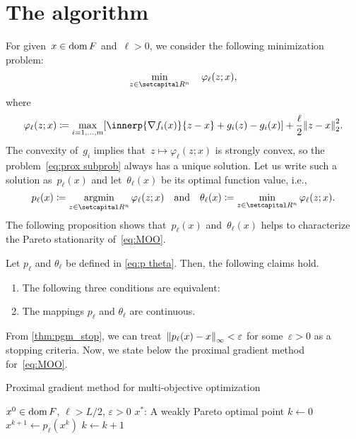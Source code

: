 \documentclass[../main]{subfiles}
\begin{document}
\section{The algorithm} \label{sec:pgm:algorithm}
For given~$x \in \dom F$ and~$\ell > 0$, we consider the following minimization problem:
\[ \label{eq:prox subprob}
    \min_{z \in \setR^n} \quad \varphi_\ell(z; x)
,\]
where
\[ \label{eq:varphi}
    \varphi_\ell(z; x) \coloneqq \max_{i = 1, \dots, m} [ \innerp{\nabla f_i(x)}{z - x} + g_i(z) - g_i(x) ] + \frac{\ell}{2} \norm*{ z - x }_2^2
.\]
The convexity of~$g_i$ implies that~$z \mapsto \varphi_\ell(z; x)$ is strongly convex, so the problem~\cref{eq:prox subprob} always has a unique solution.
Let us write such a solution as~$p_\ell(x)$ and let~$\theta_\ell(x)$ be its optimal function value, i.e.,
\[ \label{eq:p theta}
    p_\ell(x) \coloneqq \argmin_{z \in \setR^n} \varphi_\ell(z; x) \eqand \theta_\ell(x) \coloneqq \min_{z \in \setR^n} \varphi_\ell(z; x)
.\]
The following proposition shows that~$p_\ell(x)$ and~$\theta_\ell(x)$ helps to characterize the Pareto stationarity of~\cref{eq:MOO}.
\begin{lemma}\label{thm:pgm_stop}
    Let $p_\ell$ and $\theta_\ell$ be defined in \cref{eq:p theta}.
    Then, the following claims hold.
	\begin{enumerate}
        \item The following three conditions are equivalent:
             \label{thm:pgm_stop:equivalence}
		\item The mappings $p_\ell$ and $\theta_\ell$ are continuous.\label{thm:pgm_stop:cont}
	\end{enumerate}
\end{lemma}

From \cref{thm:pgm_stop}, we can treat~$\norm*{p_\ell(x) - x}_\infty < \varepsilon$ for some~$\varepsilon > 0$ as a stopping criteria.
Now, we state below the proximal gradient method for~\cref{eq:MOO}.

\begin{algorithm}[hbtp]
    \caption{Proximal gradient method for multi-objective optimization}
    \label{alg:pgm_MO}
    \begin{algorithmic}[1]
        \Require $x^0 \in \dom F$, $\ell > L / 2$, $\varepsilon > 0$
        \Ensure $x^\ast$: A weakly Pareto optimal point
        \State $k \gets 0$
        \State $x^{k + 1} \gets p_\ell(x^k)$
        \State $k \gets k + 1$
        \EndWhile
    \end{algorithmic}
\end{algorithm}
\end{document}
